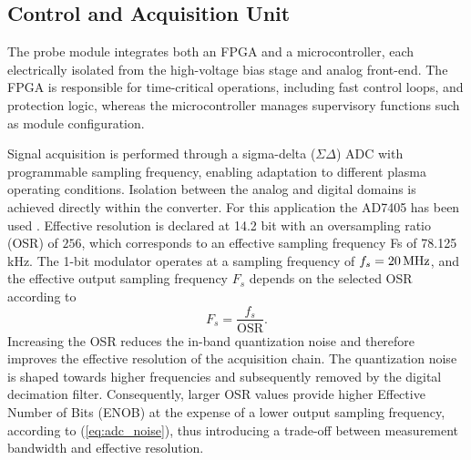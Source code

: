 \subsection{Control and Acquisition Unit}

The probe module integrates both an FPGA and a microcontroller, each electrically isolated from the high-voltage bias stage and analog front-end. The FPGA is responsible for time-critical operations, including fast control loops, and protection logic, whereas the microcontroller manages supervisory functions such as module configuration.

Signal acquisition is performed through a  sigma-delta ($\Sigma\Delta$) ADC with programmable sampling frequency, enabling adaptation to different plasma operating conditions. Isolation between the analog and digital domains is achieved directly within the converter. For this application the AD7405 has been used \cite{AD7405}. Effective resolution is declared at 14.2 bit with an oversampling ratio (OSR) of $256$, which corresponds to an effective sampling frequency Fs of 78.125 kHz. The 1-bit modulator operates at a sampling frequency of $f_s = 20 \, \mathrm{MHz}$, and the effective output sampling frequency $F_s$ depends on the selected OSR according to
\begin{equation}
	\label{eq:adc_noise}
	F_s = \frac{f_s}{\mathrm{OSR}}.
\end{equation}
Increasing the OSR reduces the in-band quantization noise and therefore improves the effective resolution of the acquisition chain. The quantization noise is shaped towards higher frequencies and subsequently removed by the digital decimation filter. Consequently, larger OSR values provide higher Effective Number of Bits (ENOB) at the expense of a lower output sampling frequency, according to (\ref{eq:adc_noise}), thus introducing a trade-off between measurement bandwidth and effective resolution.


